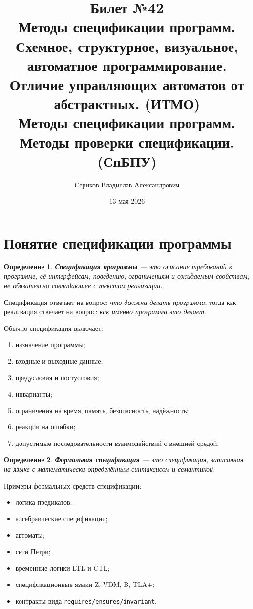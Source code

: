 \documentclass[12pt,a4paper]{article}
\title{Билет №42 \\ \small Методы спецификации программ. Схемное, структурное, визуальное, автоматное программирование. Отличие управляющих автоматов от абстрактных. (ИТМО) \\ Методы спецификации программ. Методы проверки спецификации. (СпБПУ)}
\author{Сериков Владислав Александрович}
\date{13 мая 2026}
\newtheorem{definition}{Определение}
\begin{document}
\maketitle
\tableofcontents
\newpage

\section{Понятие спецификации программы}

\begin{definition}
\textbf{Спецификация программы} --- это описание требований к программе, её интерфейсам, поведению, ограничениям и ожидаемым свойствам, не обязательно совпадающее с текстом реализации.
\end{definition}

Спецификация отвечает на вопрос: \emph{что должна делать программа}, тогда как реализация отвечает на вопрос: \emph{как именно программа это делает}.

Обычно спецификация включает:
\begin{enumerate}
    \item назначение программы;
    \item входные и выходные данные;
    \item предусловия и постусловия;
    \item инварианты;
    \item ограничения на время, память, безопасность, надёжность;
    \item реакции на ошибки;
    \item допустимые последовательности взаимодействий с внешней средой.
\end{enumerate}

\begin{definition}
\textbf{Формальная спецификация} --- это спецификация, записанная на языке с математически определённым синтаксисом и семантикой.
\end{definition}

Примеры формальных средств спецификации:
\begin{itemize}
    \item логика предикатов;
    \item алгебраические спецификации;
    \item автоматы;
    \item сети Петри;
    \item временные логики LTL и CTL;
    \item спецификационные языки Z, VDM, B, TLA+;
    \item контракты вида \texttt{requires/ensures/invariant}.
\end{itemize}
\end{document}
